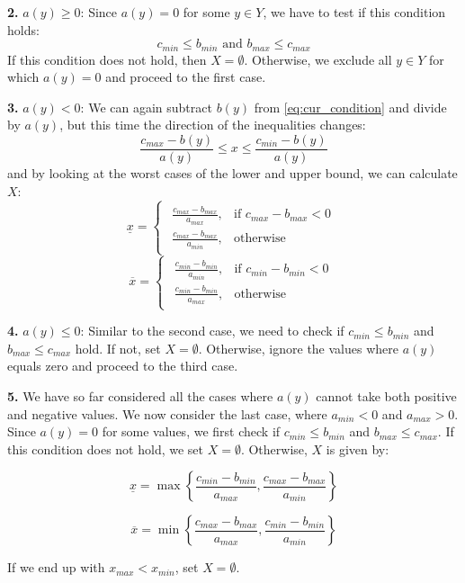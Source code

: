 \textbf{2.}
$a(y) \geq 0$:
Since $a(y) = 0$ for some $y\in Y$, we have to test if this condition holds:
\[
	c_{min} \leq b_{min} \text{ and } b_{max} \leq c_{max}
\]
If this condition does not hold, then $X=\emptyset$.
Otherwise, we exclude all $y \in Y$ for which $a(y)=0$ and proceed to the first case.

\textbf{3.}
$a(y) < 0$:
We can again subtract $b(y)$ from \eqref{eq:cur_condition} and divide by $a(y)$, but this time the direction of the inequalities changes:
\[
	\frac{c_{max}-b(y)}{a(y)} \leq x \leq \frac{c_{min}-b(y)}{a(y)}
\]
and by looking at the worst cases of the lower and upper bound, we can calculate $X$:
\[
	\underline{x} =
	\begin{cases}
		\begin{array}{ll}
			\frac{c_{max}-b_{max}}{a_{max}}, & \text{if } c_{max}-b_{max} < 0 \\[10pt]
			\frac{c_{max}-b_{max}}{a_{min}}, & \text{otherwise}
		\end{array}
	\end{cases}
\]
\[
	\overline{x} =
	\begin{cases}
		\begin{array}{ll}
			\frac{c_{min}-b_{min}}{a_{min}}, & \text{if } c_{min}-b_{min} < 0 \\[10pt]
			\frac{c_{min}-b_{min}}{a_{max}}, & \text{otherwise}
		\end{array}
	\end{cases}
\]

\textbf{4.}
$a(y) \leq 0$:
Similar to the second case, we need to check if $c_{min} \leq b_{min}$ and $b_{max} \leq c_{max}$ hold.
If not, set $X=\emptyset$.
Otherwise, ignore the values where $a(y)$ equals zero and proceed to the third case.

\textbf{5.}
We have so far considered all the cases where $a(y)$ cannot take both positive and negative values.
We now consider the last case, where $a_{min} < 0$ and $a_{max} > 0$.
Since $a(y) = 0$ for some values, we first check if $c_{min} \leq b_{min}$ and $b_{max} \leq c_{max}$.
If this condition does not hold, we set $X = \emptyset$.
Otherwise, $X$ is given by:

\[ \underline{x} = \max \left\{ \frac{c_{min} - b_{min}}{a_{max}}, \frac{c_{max} - b_{max}}{a_{min}}
	\right\} \]

\[ \overline{x} = \min \left\{ \frac{c_{max} - b_{max}}{a_{max}}, \frac{c_{min} - b_{min}}{a_{min}} \right\} \]

If we end up with $x_{max} < x_{min}$, set $X=\emptyset$.

